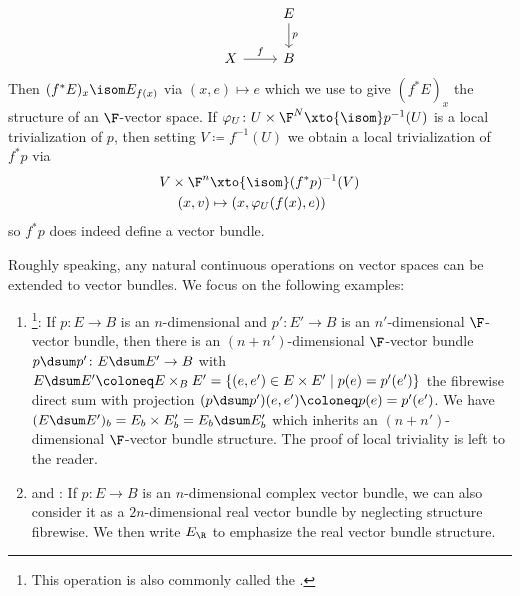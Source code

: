 \begin{definition}
\begin{enumerate}
\begin{equation*}
\begin{tikzcd}
						& E
						\ar[d, "p"]
						\\
						X
						\ar[r, "f"]
						& B
				\end{tikzcd}
			\end{equation*}
			Then $(f^* E)_x \isom E_{f(x)}$ via $(x, e) \mapsto e$ which we use to give $(f^* E)_x$ the structure of an $\F$-vector space.
			If $\varphi_U\colon U \times \F^N \xto{\isom} p^{-1}(U)$ is a local trivialization of $p$, then setting $V \coloneq f^{-1}(U)$ we obtain a local trivialization of $f^* p$ via
			\begin{align*}
				V \times \F^n &\xto{\isom} (f^* p)^{-1}(V) \\
				(x, v) &\mapsto (x, \varphi_U(f(x), e))
			\end{align*}
			so $f^* p$ does indeed define a vector bundle.
	\end{enumerate}
	Roughly speaking, any natural continuous operations on vector spaces can be extended to vector bundles.
	We focus on the following examples:
	\begin{enumerate}[resume]
		\item {}\footnote{This operation is also commonly called the .}:
			If $p\colon E \to B$ is an $n$-dimensional and $p'\colon E' \to B$ is an $n'$-dimensional $\F$-vector bundle, then there is an $(n + n')$-dimensional $\F$-vector bundle $p \dsum p'\colon E \dsum E' \to B$ with $E \dsum E' \coloneq E \times_B E' = \{(e, e') \in E \times E' \mid p(e) = p'(e')\}$ the fibrewise direct sum with projection $(p \dsum p')(e, e') \coloneq p(e) = p'(e')$.
			We have $(E \dsum E')_b = E_b \times E'_b = E_b \dsum E'_b$ which inherits an $(n + n')$-dimensional $\F$-vector bundle structure.
			The proof of local triviality is left to the reader.
		\item {} and :
			If $p\colon E \to B$ is an $n$-dimensional complex vector bundle, we can also consider it as a $2n$-dimensional real vector bundle by neglecting structure fibrewise.
			We then write $E_{\R}$ to emphasize the real vector bundle structure.


\end{enumerate}
\end{definition}
